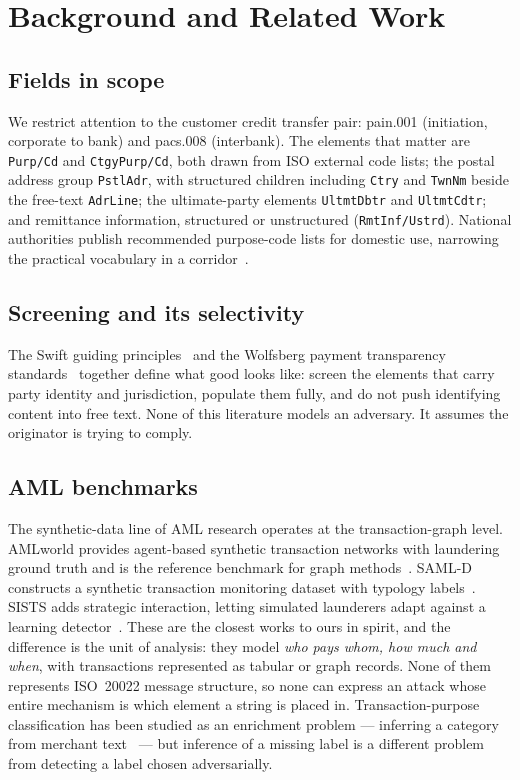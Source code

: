 \documentclass[conference]{IEEEtran}
\begin{document}
\section{Background and Related Work}

\subsection{Fields in scope}
We restrict attention to the customer credit transfer pair: pain.001
(initiation, corporate to bank) and pacs.008 (interbank). The elements that
matter are \texttt{Purp/Cd} and \texttt{CtgyPurp/Cd}, both drawn from ISO
external code lists; the postal address group \texttt{PstlAdr}, with
structured children including \texttt{Ctry} and \texttt{TwnNm} beside the
free-text \texttt{AdrLine}; the ultimate-party elements \texttt{UltmtDbtr}
and \texttt{UltmtCdtr}; and remittance information, structured or
unstructured (\texttt{RmtInf/Ustrd}). National authorities publish
recommended purpose-code lists for domestic use, narrowing the practical
vocabulary in a corridor~\cite{boe2021}.

\subsection{Screening and its selectivity}
The Swift guiding principles~\cite{swiftgp2021} and the Wolfsberg payment
transparency standards~\cite{wolfsberg2023} together define what good looks
like: screen the elements that carry party identity and jurisdiction,
populate them fully, and do not push identifying content into free text.
None of this literature models an adversary. It assumes the originator is
trying to comply.

\subsection{AML benchmarks}
The synthetic-data line of AML research operates at the transaction-graph
level. AMLworld provides agent-based synthetic transaction networks with
laundering ground truth and is the reference benchmark for graph
methods~\cite{altman2023}. SAML-D constructs a synthetic transaction
monitoring dataset with typology labels~\cite{oztas2023}. SISTS adds
strategic interaction, letting simulated launderers adapt against a learning
detector~\cite{wang2025}. These are the closest works to ours in spirit,
and the difference is the unit of analysis: they model \emph{who pays whom,
how much and when}, with transactions represented as tabular or graph
records. None of them represents ISO~20022 message structure, so none can
express an attack whose entire mechanism is which element a string is placed
in. Transaction-purpose classification has been studied as an enrichment
problem --- inferring a category from merchant text~\cite{busson2023} --- but
inference of a missing label is a different problem from detecting a label
chosen adversarially.
\end{document}
